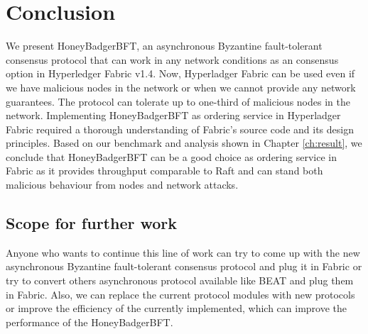 \chapter{Conclusion}
\label{ch:conclusion}
We present HoneyBadgerBFT, an asynchronous Byzantine fault-tolerant consensus protocol that can work in any network conditions as an consensus option in  Hyperledger Fabric v1.4. Now, Hyperladger Fabric can be used even if we  have malicious nodes in the network or when we cannot provide any network guarantees. The protocol can tolerate up to one-third of malicious nodes in the network. Implementing HoneyBadgerBFT as ordering service in Hyperladger Fabric required a thorough understanding of Fabric's source code  and its design principles. Based on our benchmark and analysis shown in Chapter \ref{ch:result}, we conclude that HoneyBadgerBFT can be a good choice as ordering service in Fabric as it provides throughput comparable to Raft and can stand both malicious behaviour from nodes and network attacks.

\section{Scope for further work}
Anyone who wants to continue this line of work can try to come up with the new asynchronous Byzantine fault-tolerant consensus protocol and plug it in Fabric or try to convert others asynchronous protocol available like BEAT\cite{duan2018beat} and plug them in Fabric. Also, we can replace the current protocol modules with new protocols or improve the efficiency of the currently implemented, which can improve the performance of the HoneyBadgerBFT. 